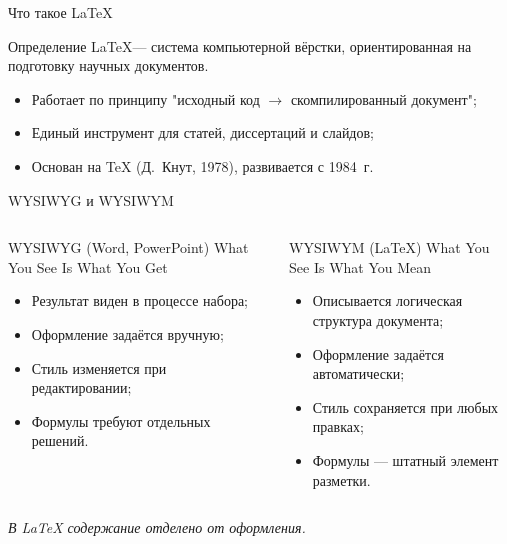 \begin{frame}[label=what-is-latex]{Что такое \LaTeX}
  \begin{block}{Определение}
    \LaTeX  --- система компьютерной вёрстки, ориентированная
    на подготовку научных документов.
  \end{block}

  \begin{itemize}
    \item Работает по принципу "исходный код $\to$ скомпилированный документ";
    \item Единый инструмент для статей, диссертаций и слайдов;
    \item Основан на \TeX{} (Д.~Кнут, 1978), развивается с 1984~г.
  \end{itemize}
\end{frame}

\begin{frame}[label=wysiwyg]{WYSIWYG и WYSIWYM}
  \begin{columns}[T,onlytextwidth]
      \begin{block}{WYSIWYG (Word, PowerPoint)}
        What You See Is What You Get
        \begin{itemize}
          \item Результат виден в процессе набора;
          \item Оформление задаётся вручную;
          \item Стиль изменяется при редактировании;
          \item Формулы требуют отдельных решений.
        \end{itemize}
      \end{block}
      \begin{exampleblock}{WYSIWYM (\LaTeX)}
        What You See Is What You Mean
        \begin{itemize}
          \item Описывается логическая структура документа;
          \item Оформление задаётся автоматически;
          \item Стиль сохраняется при любых правках;
          \item Формулы --- штатный элемент разметки.
        \end{itemize}
      \end{exampleblock}
  \end{columns}

  \vspace{0.4em}
  \centering
  \emph{В \LaTeX{} содержание отделено от оформления.}
\end{frame}

